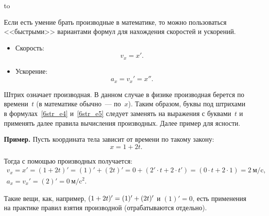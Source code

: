 \documentclass[main.tex]{subfiles}
\begin{document}
\hbox to \textwidth {\hfil\rule{.5\linewidth}{0.4pt}\hfil}

\medskip

Если есть умение брать производные в математике, то можно пользоваться <<быстрыми>> вариантами формул для нахождения скоростей и ускорений.
\begin{itemize}
    \item Скорость:
    \begin{equation}
    \label{6str_e4}
    v_x=x'.
    \end{equation} 
    \item Ускорение:
    \begin{equation}
    \label{6str_e5}
    a_x=v_x'=x''.
    \end{equation}
\end{itemize}

Штрих означает производная. В данном случае в физике производная берется по времени~$t$ (в математике обычно~--- по~$x$). Таким образом, буквы под штрихами в формулах~\eqref{6str_e4} и~\eqref{6str_e5} следует заменять на выражения с буквами~$t$ и применять далее правила вычисления производных. Далее пример для ясности. 


\begin{law}
\noindent\textbf{Пример.} Пусть координата тела зависит от времени по такому закону:
\[
x=1+2t.
\]

Тогда с помощью производных получается:
\begin{gather*}
v_x=x'=(1+2t)'=(1)'+(2t)'=0+(2'\cdot t+2\cdot t')=(0\cdot t+2\cdot 1)=2\ \text{м$/$c},\\
a_x=v_x'=(2)'=0\ \text{м$/$c$^2$}.
\end{gather*}
\end{law}

Такие вещи, как, например, $(1+2t)'=(1)'\hm+(2t)'$ и $(1)'=0$, есть применения на практике правил взятия производной (отрабатываются отдельно).  












 
\end{document}
